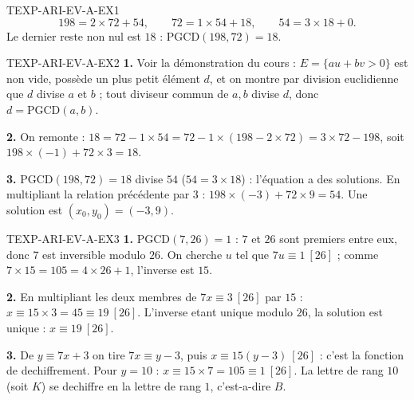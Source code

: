 %
\begin{corrige}{TEXP-ARI-EV-A-EX1}
\[
  198 = 2\times72+54, \qquad 72=1\times54+18, \qquad 54=3\times18+0.
\]
Le dernier reste non nul est $18$ : $\mathrm{PGCD}(198,72)=18$.
\end{corrige}

\begin{corrige}{TEXP-ARI-EV-A-EX2}
\textbf{1.} Voir la démonstration du cours : $E=\{au+bv>0\}$ est non vide, possède un plus petit élément $d$, et on montre par division euclidienne que $d$ divise $a$ et $b$ ; tout diviseur commun de $a,b$ divise $d$, donc $d=\mathrm{PGCD}(a,b)$.

\textbf{2.} On remonte : $18 = 72-1\times54 = 72-1\times(198-2\times72) = 3\times72-198$, soit $198\times(-1)+72\times3=18$.

\textbf{3.} $\mathrm{PGCD}(198,72)=18$ divise $54$ ($54=3\times18$) : l'équation a des solutions. En multipliant la relation précédente par $3$ : $198\times(-3)+72\times9=54$. Une solution est $(x_0,y_0)=(-3,9)$.
\end{corrige}

\begin{corrige}{TEXP-ARI-EV-A-EX3}
\textbf{1.} $\mathrm{PGCD}(7,26)=1$ : $7$ et $26$ sont premiers entre eux, donc $7$ est inversible modulo $26$. On cherche $u$ tel que $7u\equiv1\ [26]$ ; comme $7\times15=105=4\times26+1$, l'inverse est $\boxed{15}$.

\textbf{2.} En multipliant les deux membres de $7x\equiv3\ [26]$ par $15$ :
$x\equiv15\times3=45\equiv19\ [26]$. L'inverse etant unique modulo $26$, la solution
est unique : $x\equiv19\ [26]$.

\textbf{3.} De $y\equiv7x+3$ on tire $7x\equiv y-3$, puis $x\equiv15(y-3)\ [26]$ :
c'est la fonction de dechiffrement. Pour $y=10$ : $x\equiv15\times7=105\equiv1\ [26]$.
La lettre de rang $10$ (soit $K$) se dechiffre en la lettre de rang $1$, c'est-a-dire $B$.
\end{corrige}
